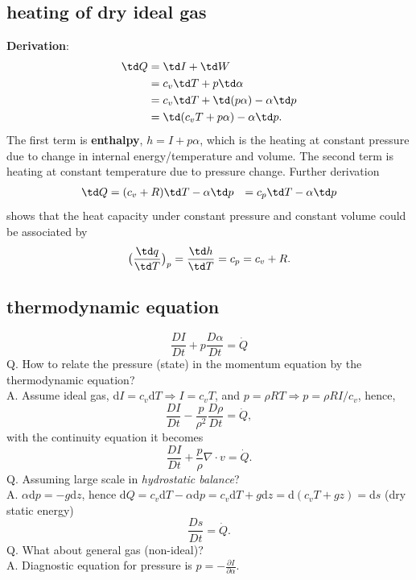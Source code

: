 \subsection{heating of dry ideal gas}
{\bf{Derivation}}:
\begin{equation}
\begin{aligned}
  \td Q & = \td I + \td W \\
        & = c_v \td T + p \td \alpha \\
        & = c_v \td T + \td(p\alpha) - \alpha \td p \\
        & = \td (c_v T + p\alpha) - \alpha \td p. 
\end{aligned}
\end{equation}
The first term is {\bf{enthalpy}}, $h = I + p\alpha$, which is the heating at constant
pressure due to change in internal energy/temperature and volume. The second term is heating at
constant temperature due to pressure change. Further derivation 
\begin{equation}
\begin{aligned}
  \td Q & = (c_v + R) \td T - \alpha \td p
        & = c_p \td T - \alpha \td p
\end{aligned}
\end{equation}
shows that the heat capacity under constant pressure and constant volume could be associated by
\begin{equation}
  \big( \frac{\td q}{\td T} \big)_p = \frac{\td h}{\td T} =  c_p = c_v + R.
\end{equation}




\subsection{thermodynamic equation}
\begin{equation}
    \frac{DI}{Dt} + p \frac{D\alpha}{Dt} = \dot{Q}
\end{equation}
Q. How to relate the pressure (state) in the momentum equation by the thermodynamic equation? \\
A. Assume ideal gas, d$I = c_v $d$T \Rightarrow I = c_v T$, and $p = \rho R T \Rightarrow p = \rho R
I / c_v$, hence,
\begin{equation}
    \frac{DI}{Dt} - \frac{p}{\rho^2} \frac{D\rho}{Dt} = \dot{Q},
\end{equation}
with the continuity equation it becomes
\begin{equation}
    \frac{DI}{Dt} + \frac{p}{\rho} \nabla \cdot v = \dot{Q}.
\end{equation}
Q. Assuming large scale in \emph{hydrostatic balance}? \\
A. $\alpha $d$ p = -g$d$z$, hence d$Q = c_v $d$T - \alpha $d$p = c_v $d$T + g$d$z = $d$(c_v T + gz)
= $d$s$ (dry
static energy)
\begin{equation}
    \frac{Ds}{Dt} = \dot{Q}.
\end{equation}
Q. What about general gas (non-ideal)? \\
A. Diagnostic equation for pressure is $p = -\frac{\partial I}{\partial \alpha}$. \\

